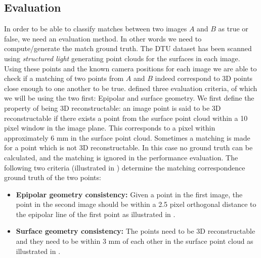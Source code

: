 \documentclass[thesis.tex]{subfiles}
\begin{document}
\subsection{Evaluation}
In order to be able to classify matches between two images $A$ and $B$ as true or false, we need an evaluation method. In other words we need to compute/generate the match ground truth. The DTU dataset has been scanned using \emph{structured light} generating point clouds for the surfaces in each image. Using these points and the known camera positions for each image we are able to check if a matching of two points from $A$ and $B$ indeed correspond to 3D points close enough to one another to be true. \citet{aanaes2010recall} defined three evaluation criteria, of which we will be using the two first: Epipolar and surface geometry. We first define the property of being 3D reconstructable: an image point is said to be 3D reconstructable if there exists a point from the surface point cloud within a 10 pixel window in the image plane. This corresponds to a pixel within approximately 6 mm in the surface point cloud. Sometimes a matching is made for a point which is not 3D reconstructable. In this case no ground truth can be calculated, and the matching is ignored in the performance evaluation. The following two criteria (illustrated in ) determine the matching correspondence ground truth of the two points:
\begin{itemize}
	\item \textbf{Epipolar geometry consistency:} Given a point in the first image, the point in the second image should be within a 2.5 pixel orthogonal distance to the epipolar line of the first point as illustrated in .
	\item \textbf{Surface geometry consistency:} The points need to be 3D reconstructable and they need to be within 3 mm of each other in the surface point cloud as illustrated in .
\end{itemize}

\end{document}
